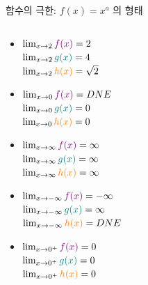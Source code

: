 \documentclass[aspectratio=169]{beamer}
\begin{document}
\begin{frame}{함수의 극한: $f(x) = x^a$ 의 형태}
\begin{columns}
    \begin{column}{0.45\textwidth}
      \begin{itemize}
        \item $\lim_{x \to 2} \textcolor{violet}{f(x)} = 2$ \\
          $\lim_{x \to 2} \textcolor{teal}{g(x)} = 4$ \\
          $\lim_{x \to 2} \textcolor{orange}{h(x)} = \sqrt{2}$
        \item $\lim_{x \to 0} \textcolor{violet}{f(x)} = DNE$\\
          $\lim_{x \to 0} \textcolor{teal}{g(x)} = 0$\\
          $\lim_{x \to 0} \textcolor{orange}{h(x)} = 0$
        \item $\lim_{x \to \infty} \textcolor{violet}{f(x)} = \infty $ \\
          $\lim_{x \to \infty} \textcolor{teal}{g(x)} = \infty $ \\
          $\lim_{x \to \infty} \textcolor{orange}{h(x)} = \infty $
        \item $\lim_{x \to -\infty} \textcolor{violet}{f(x)} = -\infty $ \\
          $\lim_{x \to -\infty} \textcolor{teal}{g(x)} = \infty $ \\
          $\lim_{x \to -\infty} \textcolor{orange}{h(x)} = DNE $
        \item $\lim_{x \to 0^+} \textcolor{violet}{f(x)} = 0$ \\
          $\lim_{x \to 0^+} \textcolor{teal}{g(x)} = 0$ \\
          $\lim_{x \to 0^+} \textcolor{orange}{h(x)} = 0$ 
      \end{itemize}
    \end{column}
  \end{columns}
\end{frame}
\end{document}

